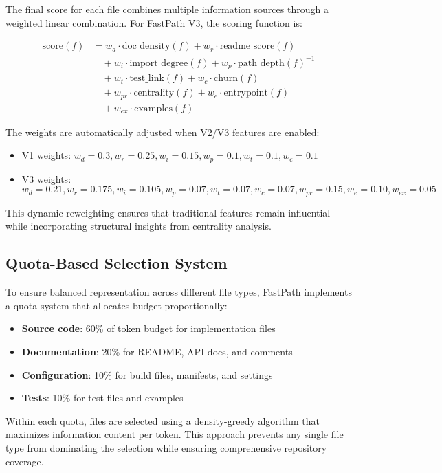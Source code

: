 \documentclass[conference]{IEEEtran}
\begin{document}
The final score for each file combines multiple information sources through a weighted linear combination. For FastPath V3, the scoring function is:

\begin{align}
\text{score}(f) &= w_d \cdot \text{doc\_density}(f) + w_r \cdot \text{readme\_score}(f) \nonumber \\
&\quad + w_i \cdot \text{import\_degree}(f) + w_p \cdot \text{path\_depth}(f)^{-1} \nonumber \\
&\quad + w_t \cdot \text{test\_link}(f) + w_c \cdot \text{churn}(f) \nonumber \\
&\quad + w_{pr} \cdot \text{centrality}(f) + w_e \cdot \text{entrypoint}(f) \nonumber \\
&\quad + w_{ex} \cdot \text{examples}(f)
\end{align}

The weights are automatically adjusted when V2/V3 features are enabled:
\begin{itemize}
\item V1 weights: $w_d=0.3, w_r=0.25, w_i=0.15, w_p=0.1, w_t=0.1, w_c=0.1$
\item V3 weights: $w_d=0.21, w_r=0.175, w_i=0.105, w_p=0.07, w_t=0.07, w_c=0.07, w_{pr}=0.15, w_e=0.10, w_{ex}=0.05$
\end{itemize}

This dynamic reweighting ensures that traditional features remain influential while incorporating structural insights from centrality analysis.

\subsection{Quota-Based Selection System}

To ensure balanced representation across different file types, FastPath implements a quota system that allocates budget proportionally:

\begin{itemize}
\item \textbf{Source code}: 60\% of token budget for implementation files
\item \textbf{Documentation}: 20\% for README, API docs, and comments
\item \textbf{Configuration}: 10\% for build files, manifests, and settings
\item \textbf{Tests}: 10\% for test files and examples
\end{itemize}

Within each quota, files are selected using a density-greedy algorithm that maximizes information content per token. This approach prevents any single file type from dominating the selection while ensuring comprehensive repository coverage.
\end{document}
